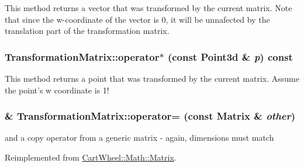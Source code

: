 \label{classCartWheel_1_1Math_1_1TransformationMatrix_ac2b10ebee0e90020af600324b29174a5}
This method returns a vector that was transformed by the current matrix. Note that since the w-\/coordinate of the vector is 0, it will be unnafected by the translation part of the transformation matrix. \hypertarget{classCartWheel_1_1Math_1_1TransformationMatrix_a51a96104914fd804898c192d8c8e1092}{
\subsubsection[{operator$\ast$}]{ TransformationMatrix::operator$\ast$ (const {\bf Point3d} \& {\em p}) const}}
\label{classCartWheel_1_1Math_1_1TransformationMatrix_a51a96104914fd804898c192d8c8e1092}
This method returns a point that was transformed by the current matrix. Assume the point's w coordinate is 1! \hypertarget{classCartWheel_1_1Math_1_1TransformationMatrix_ab04a5715c7f1ff7dd912b34abfce10c4}{
\subsubsection[{operator=}]{ \& TransformationMatrix::operator= (const {\bf Matrix} \& {\em other})}}
\label{classCartWheel_1_1Math_1_1TransformationMatrix_ab04a5715c7f1ff7dd912b34abfce10c4}
and a copy operator from a generic matrix -\/ again, dimensions must match 

Reimplemented from \hyperlink{classCartWheel_1_1Math_1_1Matrix_a3e40db12ae78b7616ee3f099bb15f13d}{CartWheel::Math::Matrix}.

